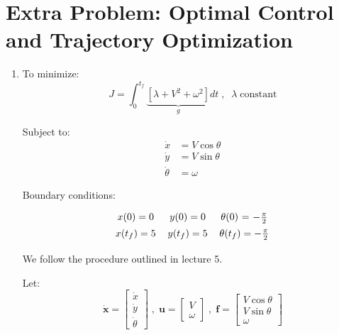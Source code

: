 \documentclass{article}
\begin{document}
\pagebreak

\section*{Extra Problem: Optimal Control and Trajectory Optimization}

	\begin{enumerate}[label=(\roman*)]
	
	\item %
	To minimize:
	\begin{equation}
	J = \int_0^{t_f} \underbrace{[\lambda + V^2 + \omega^2]}_{g} dt \;,\;\; \lambda \; \text{constant}
	\end{equation}
	
	Subject to:
	\begin{equation}
	\begin{aligned}
	\dot{x} &= V\cos\theta \\
	\dot{y} &= V\sin\theta \\
	\dot{\theta} &= \omega
	\end{aligned}
	\end{equation}
	
	Boundary conditions:
	\begin{equation}
	{\renewcommand{\arraystretch}{1.4}
	\begin{tabular}[c]{c c c}
		$x(0) = 0$ & $y(0) = 0$ & $\theta(0)$ = $-\frac{\pi}{2}$ \\
		$x(t_f) = 5$ & $y(t_f) = 5$ & $\theta(t_f) = -\frac{\pi}{2}$
	\end{tabular}}
	\end{equation}
	
	\hrulefill
	
	We follow the procedure outlined in lecture 5.
	
	Let:
	\begin{equation}
	\dot{\bm{x}} =
	\begin{bmatrix}
	\dot x \\
	\dot y \\
	\dot \theta
	\end{bmatrix} \; , \;
	\bm{u} = 
	\begin{bmatrix}
	V \\
	\omega
	\end{bmatrix} \; , \;
	\bm f = 
	\begin{bmatrix}
	V\cos\theta \\
	V\sin\theta \\
	\omega
	\end{bmatrix}
	\end{equation}
	

\end{enumerate}
\end{document}
